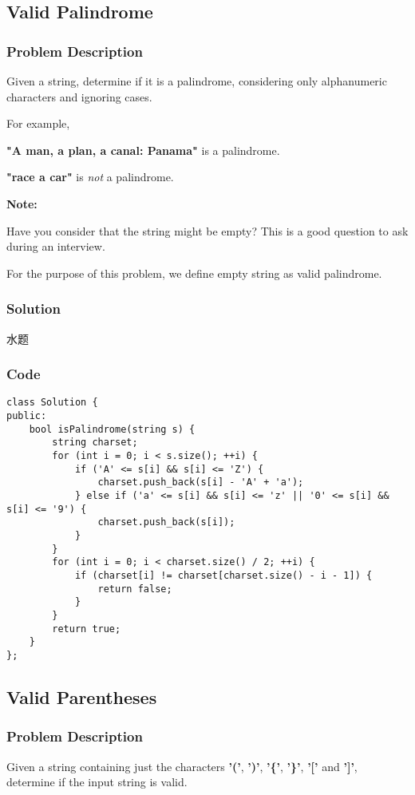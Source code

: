 \documentclass[courier]{article}
\begin{document}
\begin{CJK*}{UTF8}{gkai}
\subsection{ Valid Palindrome }

\subsubsection*{Problem Description}
Given a string, determine if it is a palindrome, considering only alphanumeric characters and ignoring cases.

For example,


\textbf{"A man, a plan, a canal: Panama"} is a palindrome.


\textbf{"race a car"} is \emph{not} a palindrome.

\textbf{Note:}


Have you consider that the string might be empty? This is a good question to ask during an interview.

For the purpose of this problem, we define empty string as valid palindrome.



\subsubsection*{Solution}
水题

\subsubsection*{Code}
\begin{lstlisting}
class Solution {
public:
    bool isPalindrome(string s) {
        string charset;
        for (int i = 0; i < s.size(); ++i) {
            if ('A' <= s[i] && s[i] <= 'Z') {
                charset.push_back(s[i] - 'A' + 'a');
            } else if ('a' <= s[i] && s[i] <= 'z' || '0' <= s[i] && s[i] <= '9') {
                charset.push_back(s[i]);
            }
        }
        for (int i = 0; i < charset.size() / 2; ++i) {
            if (charset[i] != charset[charset.size() - i - 1]) {
                return false;
            }
        }
        return true;
    }
}; 
\end{lstlisting}


\subsection{ Valid Parentheses }

\subsubsection*{Problem Description}
Given a string containing just the characters \textbf{'('}, \textbf{')'}, \textbf{'\{'}, \textbf{'\}'}, \textbf{'['} and \textbf{']'}, determine if the input string is valid.


\end{CJK*}
\end{document}
